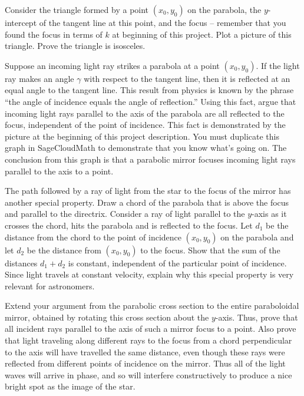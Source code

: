 \documentclass
[justified,nohyper]
{tufte-handout}
\theoremstyle{mydef}
\begin{document}
Consider the triangle formed by a point $(x_0,y_0)$ on the parabola, the $y$-intercept of the tangent line at this point, and the focus -- remember that you found the focus in terms of $k$ at beginning of this project. Plot a picture of this triangle. Prove the triangle is isosceles.

Suppose an incoming light ray strikes a parabola at a point $(x_0,y_0)$. If the light ray makes an angle $\gamma$ with respect to the tangent line, then it is reflected at an equal angle to the tangent line. This result from physics is known by the phrase ``the angle of incidence equals the angle of reflection.'' Using this fact, argue that incoming light rays parallel to the axis of the parabola are all reflected to the focus, independent of the point of incidence. This fact is demonstrated by the picture at the beginning of this project description. You must duplicate this graph in SageCloudMath to demonstrate that you know what's going on. The conclusion from this graph is that a parabolic mirror focuses incoming light rays parallel to the axis to a point.

The path followed by a ray of light from the star to the focus of the mirror has another special property. Draw a chord of the parabola that is above the focus and parallel to the directrix. Consider a ray of light parallel to the $y$-axis as it crosses the chord, hits the parabola and is reflected to the focus. Let $d_1$ be the distance from the chord to the point of incidence $(x_0,y_0)$ on the parabola and let $d_2$ be the distance from $(x_0,y_0)$ to the focus. Show that the sum of the distances $d_1+d_2$ is constant, independent of the particular point of incidence. Since light travels at constant velocity, explain why this special property is very relevant for astronomers.

Extend your argument from the parabolic cross section to the entire paraboloidal mirror, obtained by rotating this cross section about the $y$-axis. Thus, prove that all incident rays parallel to the axis of such a mirror focus to a point. Also prove that light traveling along different rays to the focus from a chord perpendicular to the axis will have travelled the same distance, even though these rays were reflected from different points of incidence on the mirror. Thus all of the light waves will arrive in phase, and so will interfere constructively to produce a nice bright spot as the image of the star.
\end{document}
